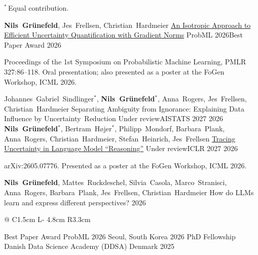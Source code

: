 \documentclass[11pt, a4paper]{awesome-cv}
\makeatletter
\let\acvOrigSection\cvsection
\renewcommand{\cvsection}[1]{\Needspace*{4cm}\acvOrigSection{#1}}
\renewenvironment{cvhonors}{%
  \vspace{\acvSectionContentTopSkip}
  \vspace{-2mm}
  \begin{center}
    \setlength\tabcolsep{0pt}
    \setlength{\extrarowheight}{0pt}
    \begin{tabular*}{\textwidth}{@{\extracolsep{\fill}} C{1.5cm} L{\textwidth - 4.8cm} R{3.3cm}}
}{%
    \end{tabular*}
  \end{center}
}
\makeatother
\begin{document}
\par
\begin{cvparagraph}
  $^{*}$\,Equal contribution.
\end{cvparagraph}
\begin{cventries}
  \cventry
    {\textbf{Nils~Grünefeld}, Jes~Frellsen, Christian~Hardmeier}
    {\href{https://proceedings.mlr.press/v327/grunefeld26a.html}{An Isotropic Approach to Efficient Uncertainty Quantification with Gradient Norms}}
    {ProbML 2026{\enskip\cdotp\enskip}Best Paper Award}
    {2026}
    {
      \begin{cvitems}
        \item {Proceedings of the 1st Symposium on Probabilistic Machine Learning, PMLR 327:86--118. Oral presentation; also presented as a poster at the FoGen Workshop, ICML 2026.}
      \end{cvitems}
    }
\end{cventries}
\begin{cventries}
  \cventry
    {Johannes~Gabriel~Sindlinger$^{*}$, \textbf{Nils~Grünefeld}$^{*}$, Anna~Rogers, Jes~Frellsen, Christian~Hardmeier}
    {Separating Ambiguity from Ignorance: Explaining Data Influence by Uncertainty~Reduction}
    {Under review{\enskip\cdotp\enskip}AISTATS 2027}
    {2026}
    {}
  \vspace{2.5mm}
  \cventry
    {\textbf{Nils~Grünefeld}$^{*}$, Bertram~Højer$^{*}$, Philipp~Mondorf, Barbara~Plank, Anna~Rogers, Christian~Hardmeier, Stefan~Heinrich, Jes~Frellsen}
    {\href{https://arxiv.org/abs/2605.07776}{Tracing Uncertainty in Language Model ``Reasoning''}}
    {Under review{\enskip\cdotp\enskip}ICLR 2027}
    {2026}
    {
      \begin{cvitems}
        \item {arXiv:2605.07776. Presented as a poster at the FoGen Workshop, ICML 2026.}
      \end{cvitems}
    }
\end{cventries}
\begin{cventries}
  \cventry
    {\textbf{Nils~Grünefeld}, Mattes~Ruckdeschel, Silvia~Casola, Marco~Stranisci, Anna~Rogers, Barbara~Plank, Jes~Frellsen, Christian~Hardmeier}
    {How do LLMs learn and express different perspectives?}
    {}
    {2026}
    {}
\end{cventries}

\begin{cvhonors}
  \cvhonor
    {Best Paper Award}
    {ProbML 2026}
    {Seoul, South Korea}
    {2026}
  \cvhonor
    {PhD Fellowship}
    {Danish Data Science Academy (DDSA)}
    {Denmark}
    {2025}
\end{cvhonors}
\end{document}
